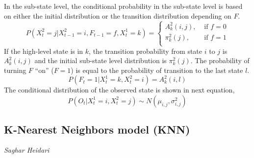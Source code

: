  In the sub-state level, the conditional probability in the sub-state level is based on either the initial distribution or the transition distribution depending on $F$.
\begin{equation}
 P(X_{t}^{2}=j|X_{t-1}^{2}=i,F_{t-1}=f,X_{t}^{1}=k)=\begin{cases} 
A_{k}^{2}(i,j),& \text{ if } f= 0 \\ 
\pi_{k}^{2}(j) ,& \text{ if } f=1 \\ 
\end{cases}
\end{equation}
If the high-level state is in $k$, the transition probability from state $i$ to $j$ is $A_{k}^{2}(i,j)$ and the initial sub-state level distribution is $\pi_{k}^{2}(j)$. The probability
of turning $F$ “on” ($F=1$) is equal to the probability of transition to the last state $l$.
\begin{equation}
    P(F_{t}=1|X_{t}^{1}=k,X_{t}^{2}=i)= A_{k}^{2}(i,l)
\end{equation}
The conditional distribution of the observed state is shown in next equation,
\begin{equation}
P(O_{t}|X_{t}^{1}=i,X_{t}^{2}=j)\sim N(\mu _{i,j},\sigma _{i,j}^{2})
\end{equation}



\subsection{K-Nearest Neighbors model (KNN)}
\vspace*{-12mm}
\hfill{\normalsize\emph{Saghar Heidari}}

